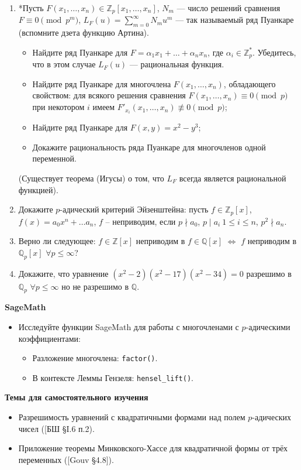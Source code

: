 \begin{enumerate}[topsep=0pt]
    \item *Пусть $F(x_1,\dots, x_n) \in \mathbb{Z}_p[x_1,\dots, x_n]$, $N_m$ --- число решений сравнения $F \equiv 0 \pmod{p^m}$, $L_F(u) = \sum_{m=0}^\infty N_m u^m$ --- так называемый ряд Пуанкаре (вспомните дзета функцию Артина).
    \begin{itemize}[topsep=0pt]
        \item Найдите ряд Пуанкаре для $F = \alpha_1 x_1 + \dots + \alpha_n x_n$, где $\alpha_i \in \mathbb{Z}_p^*$. Убедитесь, что в этом случае $L_F(u)$ --- рациональная функция.
        \item Найдите ряд Пуанкаре для многочлена $F(x_1,\dots, x_n)$, обладающего свойством: для всякого решения сравнения $F(x_1,\dots, x_n) \equiv 0 \pmod{p}$ при некотором $i$ имеем $F'_{x_i}(x_1,\dots, x_n) \not\equiv 0 \pmod{p}$;
        \item Найдите ряд Пуанкаре для $F(x,y)=x^2-y^3$;
        \item Докажите рациональность ряда Пуанкаре для многочленов одной переменной. 
    \end{itemize}
    (Существует теорема (Игусы) о том, что $L_F$ всегда является рациональной функцией).

    \item Докажите $p$-адический критерий Эйзенштейна: пусть $f\in \mathbb{Z}_p[x]$, $f(x) = a_0 x^n+ \dots a_n$, $f$ -- неприводим, если $p \nmid a_0$, $p \mid a_i\ 1\leqslant i \leqslant n$, $p^2 \nmid a_n$.

    \item Верно ли следующее: $f\in \mathbb{Z}[x]$ неприводим в $f\in \mathbb{Q}[x]$ $\Leftrightarrow$ $f$ неприводим в $ \mathbb{Q}_p[x]$ $\forall p\leqslant\infty$? %

    \item Докажите, что уравнение $(x^2-2)(x^2-17)(x^2-34)=0$ разрешимо в $\mathbb{Q}_p$ $\forall p\leqslant \infty$ но не разрешимо в $\mathbb{Q}$.
  
\end{enumerate}

\noindent\textbf{SageMath}
\begin{itemize}[topsep=0pt]
    \item Исследуйте функции SageMath для работы с многочленами с $p$-адическими коэффициентами:
    \begin{itemize}[noitemsep,topsep=0pt]
        \item Разложение многочлена: \texttt{factor()}.
        \item В контексте Леммы Гензеля: \texttt{hensel\_lift()}.
    \end{itemize}
\end{itemize}

\noindent\textbf{Темы для самостоятельного изучения}
\begin{itemize}[topsep=0pt]
    \item Разрешимость уравнений с квадратичными формами над полем $p$-адических чисел ([БШ \S I.6 п.2).
    \item Приложение теоремы Минковского-Хассе для квадратичной формы от трёх переменных ([Gouv \S 4.8]).
\end{itemize}


